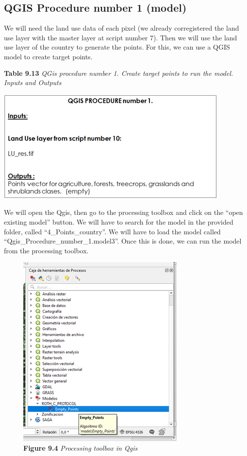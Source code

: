 \documentclass[
  10pt,
  b5paper,
]{book}
\begin{document}
\hypertarget{qgis-procedure-number-1-model}{%
\subsection{QGIS Procedure number 1 (model)}\label{qgis-procedure-number-1-model}}

We will need the land use data of each pixel (we already corregistered the land use layer with the master layer at script number 7). Then we will use the land use layer of the country to generate the points. For this, we can use a QGIS model to create target points.

\textbf{Table 9.13} \emph{QGis procedure number 1. Create target points to run the model. Inputs and Outputs}

\includegraphics{tables/Table_9.12.png}

We will open the Qgis, then go to the processing toolbox and click on the ``open existing model'' button. We will have to search for the model in the provided folder, called ``4\_Points\_country''. We will have to load the model called ``Qgis\_Procedure\_number\_1.model3''. Once this is done, we can run the model from the processing toolbox.

\begin{figure}
\centering
\includegraphics{images/Figure_9.4.png}
\caption{\textbf{Figure 9.4} \emph{Processing toolbox in Qgis}}
\end{figure}
\end{document}
